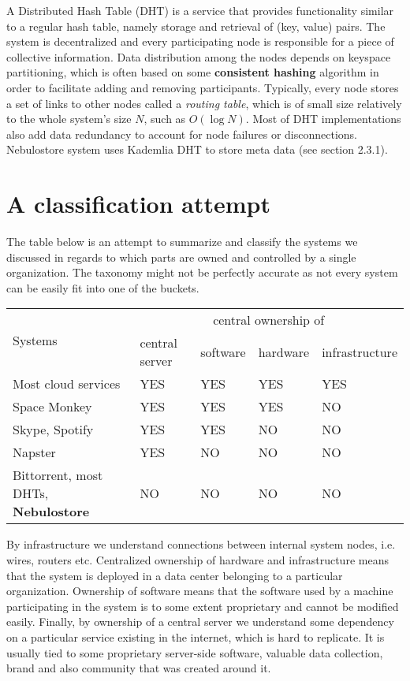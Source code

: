 \documentclass{pracamgren}
\newcounter{collective_ctr} \numberwithin{collective_ctr}{section}
\begin{document}
A Distributed Hash Table (DHT) is a service that provides functionality similar to a regular hash table, namely storage and retrieval of (key, value) pairs. The system is decentralized and every participating node is responsible for a piece of collective information. Data distribution among the nodes depends on keyspace partitioning, which is often based on some {\bf consistent hashing} algorithm in order to facilitate adding and removing participants. Typically, every node stores a set of links to other nodes called a {\it routing table}, which is of small size relatively to the whole system's size $N$, such as $O(\log N)$. Most of DHT implementations also add data redundancy to account for node failures or disconnections. Nebulostore system uses Kademlia \cite{kademlia} DHT to store meta data (see section 2.3.1).\\

\section{A classification attempt}

The table below is an attempt to summarize and classify the systems we discussed in regards to which parts are owned and controlled by a single organization. The taxonomy might not be perfectly accurate as not every system can be easily fit into one of the buckets.

\begin{center}
    \begin{tabular}{ | l | l | l | l | l |}
    \hline
    \multirow{2}{*}{Systems} & \multicolumn{4}{|c|}{central ownership of} \\
    \cline{2-5}
     & central server & software & hardware & infrastructure \\
    \hline
    Most cloud services & YES & YES & YES & YES \\
    \hline
    Space Monkey & YES & YES & YES & NO \\
    \hline
    Skype, Spotify & YES & YES & NO & NO\\
    \hline
    Napster & YES & NO & NO & NO\\
    \hline
    Bittorrent, most DHTs, {\bf Nebulostore} & NO & NO & NO & NO \\
    \hline
    \end{tabular}
\end{center}

By infrastructure we understand connections between internal system nodes, i.e. wires, routers etc.
Centralized ownership of hardware and infrastructure means that the system is deployed in a data center belonging to a particular organization. Ownership of software means that the software used by a machine participating in the system is to some extent proprietary and cannot be modified easily. Finally, by ownership of a central server we understand some dependency on a particular service existing in the internet, which is hard to replicate. It is usually tied to some proprietary server-side software, valuable data collection, brand and also community that was created around it.\\
\end{document}
